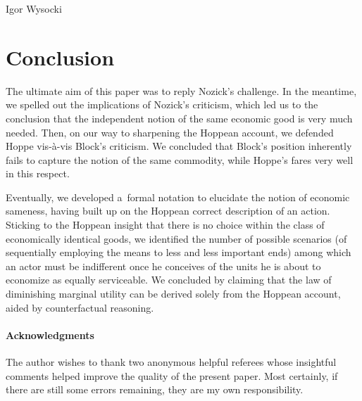 \begin{artengenv}{Igor Wysocki}
\section{Conclusion}
The ultimate aim of this paper was to reply Nozick's challenge. In the meantime, we spelled out the implications of Nozick's criticism, which led us to the conclusion that the independent notion of the same economic good is very much needed. Then, on our way to sharpening the Hoppean account, we defended Hoppe vis-à-vis Block's criticism. We concluded that Block's position inherently fails to capture the notion of the same commodity, while Hoppe's fares very well in this respect.

Eventually, we developed a~formal notation to elucidate the notion of economic sameness, having built up on the Hoppean correct description of an action. Sticking to the Hoppean insight that there is no choice within the class of economically identical goods, we identified the number of possible scenarios (of sequentially employing the means to less and less important ends) among which an actor must be indifferent once he conceives of the units he is about to economize as equally serviceable. We concluded by claiming that the law of diminishing marginal utility can be derived solely from the Hoppean account, aided by counterfactual reasoning.

\paragraph{Acknowledgments}
The author wishes to thank two anonymous helpful referees whose insightful comments helped improve the quality of the present paper. Most certainly, if there are still some errors remaining, they are my own responsibility.



\end{artengenv}